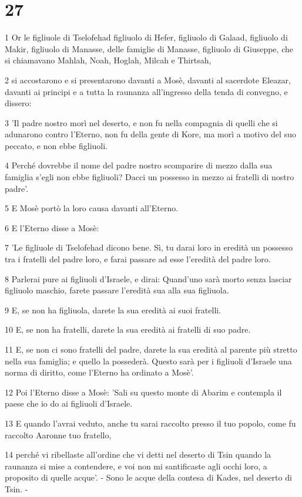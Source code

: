 \chapter{27}

\par 1 Or le figliuole di Tselofehad figliuolo di Hefer, figliuolo di Galaad, figliuolo di Makir, figliuolo di Manasse, delle famiglie di Manasse, figliuolo di Giuseppe, che si chiamavano Mahlah, Noah, Hoglah, Milcah e Thirtsah,
\par 2 si accostarono e si presentarono davanti a Mosè, davanti al sacerdote Eleazar, davanti ai principi e a tutta la raunanza all'ingresso della tenda di convegno, e dissero:
\par 3 'Il padre nostro morì nel deserto, e non fu nella compagnia di quelli che si adunarono contro l'Eterno, non fu della gente di Kore, ma morì a motivo del suo peccato, e non ebbe figliuoli.
\par 4 Perché dovrebbe il nome del padre nostro scomparire di mezzo dalla sua famiglia s'egli non ebbe figliuoli? Dacci un possesso in mezzo ai fratelli di nostro padre'.
\par 5 E Mosè portò la loro causa davanti all'Eterno.
\par 6 E l'Eterno disse a Mosè:
\par 7 'Le figliuole di Tselofehad dicono bene. Sì, tu darai loro in eredità un possesso tra i fratelli del padre loro, e farai passare ad esse l'eredità del padre loro.
\par 8 Parlerai pure ai figliuoli d'Israele, e dirai: Quand'uno sarà morto senza lasciar figliuolo maschio, farete passare l'eredità sua alla sua figliuola.
\par 9 E, se non ha figliuola, darete la sua eredità ai suoi fratelli.
\par 10 E, se non ha fratelli, darete la sua eredità ai fratelli di suo padre.
\par 11 E, se non ci sono fratelli del padre, darete la sua eredità al parente più stretto nella sua famiglia; e quello la possederà. Questo sarà per i figliuoli d'Israele una norma di diritto, come l'Eterno ha ordinato a Mosè'.
\par 12 Poi l'Eterno disse a Mosè: 'Sali su questo monte di Abarim e contempla il paese che io do ai figliuoli d'Israele.
\par 13 E quando l'avrai veduto, anche tu sarai raccolto presso il tuo popolo, come fu raccolto Aaronne tuo fratello,
\par 14 perché vi ribellaste all'ordine che vi detti nel deserto di Tsin quando la raunanza si mise a contendere, e voi non mi santificaste agli occhi loro, a proposito di quelle acque'. - Sono le acque della contesa di Kades, nel deserto di Tsin. -
